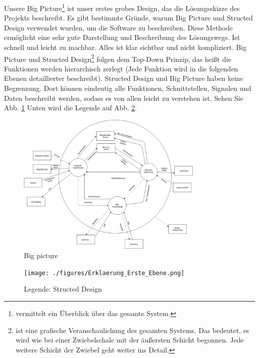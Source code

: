 	Unsere Big Picture\footnote{vermittelt ein \"Uberblick \"uber das gesamte System.\cite{Bigpicture}} ist unser erstes grobes Design, das die Lösungsskizze des Projekts beschreibt. Es gibt bestimmte Gründe, warum Big Picture und Structed Design verwendet wurden, um die Software zu beschreiben. Diese Methode ermöglicht eine sehr gute Darstellung und Beschreibung des Lösungswegs. Ist schnell und leicht zu machbar. Alles ist klar sichtbar und nicht kompliziert. Big Picture und Structed Design\footnote{ist eine grafische Veranschaulichung des gesamten Systems. Das bedeutet, es wird wie bei einer Zwiebelschale mit der \"au{\ss}ersten Schicht begonnen. Jede weitere Schicht der Zwiebel geht weiter ins Detail.\cite{Bigpicture}} folgen dem Top-Down Prinzip, das heißt die Funktionen werden hierarchisch zerlegt (Jede Funktion wird in die folgenden Ebenen detaillierter beschreibt). Structed Design und Big Picture haben keine Begrenzung. Dort können eindeutig alle Funktionen, Schnittstellen, Signalen und Daten beschreibt werden, sodass es von allen leicht zu verstehen ist. Sehen Sie Abb. \ref{fig:bigpicture} 
	Unten wird die Legende auf Abb. \ref{fig:structed}.

\begin{figure}[ht]
	\includegraphics[width=0.8\textwidth]{./figures/Big_Picture.jpg}
	\centering
	\caption{Big picture}
	\label{fig:bigpicture}
\end{figure}
	\begin{figure}[ht]
	\texttt{[image: ./figures/Erklaerung\_Erste\_Ebene.png]}
	\centering
	\caption{Legende: Structed Design}
	\label{fig:structed}
\end{figure}

